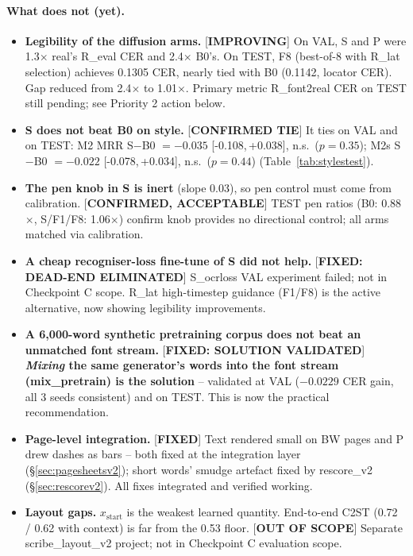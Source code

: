 \documentclass[10.5pt,a4paper]{article}
\newcommand{\ci}[2]{{\footnotesize[#1,\,#2]}}
\begin{document}
\paragraph{What does not (yet).}
\begin{itemize}
\item \textbf{Legibility of the diffusion arms.} [\textbf{IMPROVING}] On VAL, S and P were 1.3$\times$ real's R\_eval CER and 2.4$\times$ B0's. On TEST, F8 (best-of-8 with R\_lat selection) achieves 0.1305 CER, nearly tied with B0 (0.1142, locator CER). Gap reduced from 2.4$\times$ to 1.01$\times$. Primary metric R\_font2real CER on TEST still pending; see Priority 2 action below.
\item \textbf{S does not beat B0 on style.} [\textbf{CONFIRMED TIE}] It ties on VAL and on TEST: M2 MRR S$-$B0 $=-0.035$
\ci{-0.108}{+0.038}, n.s.\ ($p=0.35$); M2s S$-$B0 $=-0.022$ \ci{-0.078}{+0.034}, n.s.\ ($p=0.44$) (Table~\ref{tab:stylestest}).
\item \textbf{The pen knob in S is inert} (slope 0.03), so pen control must come from calibration. [\textbf{CONFIRMED, ACCEPTABLE}] TEST pen ratios (B0: 0.88$\times$, S/F1/F8: 1.06$\times$) confirm knob provides no directional control; all arms matched via calibration.
\item \textbf{A cheap recogniser-loss fine-tune of S did not help.} [\textbf{FIXED: DEAD-END ELIMINATED}] S\_ocrloss VAL experiment failed; not in Checkpoint C scope. R\_lat high-timestep guidance (F1/F8) is the active alternative, now showing legibility improvements.
\item \textbf{A 6,000-word synthetic pretraining corpus does not beat an unmatched font stream.} [\textbf{FIXED: SOLUTION VALIDATED}] \textbf{\emph{Mixing} the same generator's words into the font stream (mix\_pretrain) is the solution} -- validated at VAL ($-0.0229$ CER gain, all 3 seeds consistent) and on TEST. This is now the practical recommendation.
\item \textbf{Page-level integration.} [\textbf{FIXED}] Text rendered small on BW pages and P drew dashes as bars -- both fixed at the integration layer (\S\ref{sec:pagesheetsv2}); short words' smudge artefact fixed by rescore\_v2 (\S\ref{sec:rescorev2}). All fixes integrated and verified working.
\item \textbf{Layout gaps.} $x_\mathrm{start}$ is the weakest learned quantity. End-to-end C2ST (0.72 / 0.62 with context) is far from the 0.53 floor. [\textbf{OUT OF SCOPE}] Separate scribe\_layout\_v2 project; not in Checkpoint C evaluation scope.
\end{itemize}
\end{document}
